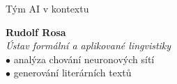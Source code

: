\documentclass[aspectratio=169,dvipsnames]{beamer}
\begin{document}
\begin{frame}{Tým AI v kontextu}
    \hspace{40pt}\begin{minipage}{70pt}
    \end{minipage}\begin{minipage}{250pt}
        \textbf{Rudolf Rosa} \\
        \textit{Ústav formální a aplikované lingvistiky} \\
        \quad$\bullet$ analýza chování neuronových sítí \\
        \quad$\bullet$ generování literárních textů
    \end{minipage}

    \vspace{10pt}


\end{frame}
\end{document}

